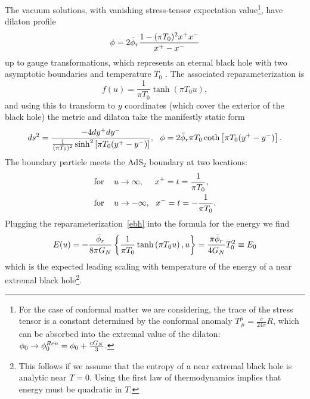 \documentclass[12pt]{article}
\begin{document}
The vacuum solutions, with vanishing stress-tensor expectation value\footnote{For the case of conformal matter we are considering, the trace of the stress tensor is a constant determined by the conformal anomaly $ T_{ \ \mu}^\mu  = \frac{c}{24 \pi} R  $, which can be absorbed into the extremal value of the dilaton: $\phi_0 \rightarrow \phi_0^{Ren} = \phi_0 + {c G_N \over 3}$.}, have dilaton profile
\begin{align}\label{eq:BHdilaton}
\phi = 2 \bar{\phi}_r { 1 - {(\pi  T_0)^2} x^+ x^-  \over x^+ - x^-}
\end{align}
up to gauge transformations, which represents an eternal black hole with two asymptotic boundaries and temperature $T_0$ \cite{Almheiri:2014cka}.
The associated reparameterization is
\begin{equation} \label{ebh}
	f(u) = \frac{1}{\pi T_0} \tanh(\pi T_0 u),
\end{equation}
and using this to transform to $y$ coordinates (which cover the exterior of the black hole) the metric and dilaton take the manifestly static form
\begin{align}
ds^2 = {-4 dy^+ dy^- \over {1 \over (\pi  T_0)^2}\sinh^2\left[ \pi  T_0(  y^+ - y^- )\right]}, \ \ \phi = 2 \bar{\phi}_r {\pi  T_0 } \coth \left[  {\pi  T_0 }(  y^+ - y^- )\right].
\end{align}
The boundary particle meets the AdS$_2$ boundary at two locations:
\begin{subequations}
\begin{align}
&\mathrm{for\ }\hspace{0.3cm} u \rightarrow  \infty, \ \ \ \ x^+ = t = {1 \over \pi T_0}, \\
&\mathrm{for \ }\hspace{0.3cm}  u \rightarrow  -\infty, \ \ x^- = t = -{1 \over \pi T_0}.
\end{align}
\end{subequations}
Plugging the reparameterization~\eqref{ebh} into the formula for the energy we find
\begin{align}
E(u) = - {\bar{\phi}_r \over 8 \pi G_N} \left\{ {1 \over \pi  T_0} \tanh \left( {\pi  T_0} u  \right), u \right\} = {\pi \bar{\phi}_r \over 4 G_N} {T_0^2} \equiv E_0
\end{align}
which is the expected leading scaling with temperature of the energy of a near extremal black hole\footnote{This follows if we assume that the entropy of a near extremal black hole is analytic near $T = 0$. Using the first law of thermodynamics implies that energy must be quadratic in $T$.}.
\end{document}

